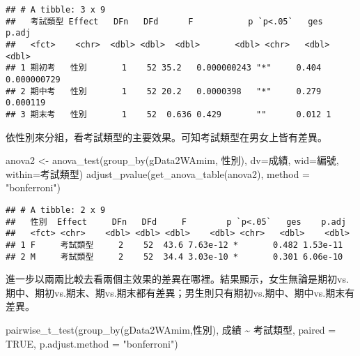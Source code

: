 \documentclass[
]{book}
\newenvironment{Shaded}{\begin{snugshade}}{\end{snugshade}}
\newcommand{\AttributeTok}[1]{\textcolor[rgb]{0.77,0.63,0.00}{#1}}
\newcommand{\ConstantTok}[1]{\textcolor[rgb]{0.00,0.00,0.00}{#1}}
\newcommand{\FunctionTok}[1]{\textcolor[rgb]{0.00,0.00,0.00}{#1}}
\newcommand{\NormalTok}[1]{#1}
\newcommand{\OtherTok}[1]{\textcolor[rgb]{0.56,0.35,0.01}{#1}}
\newcommand{\SpecialCharTok}[1]{\textcolor[rgb]{0.00,0.00,0.00}{#1}}
\newcommand{\StringTok}[1]{\textcolor[rgb]{0.31,0.60,0.02}{#1}}
\begin{document}
\begin{verbatim}
## # A tibble: 3 x 9
##   考試類型 Effect   DFn   DFd      F           p `p<.05`   ges       p.adj
##   <fct>    <chr>  <dbl> <dbl>  <dbl>       <dbl> <chr>   <dbl>       <dbl>
## 1 期初考   性別       1    52 35.2   0.000000243 "*"     0.404 0.000000729
## 2 期中考   性別       1    52 20.2   0.0000398   "*"     0.279 0.000119   
## 3 期末考   性別       1    52  0.636 0.429       ""      0.012 1
\end{verbatim}

依性別來分組，看考試類型的主要效果。可知考試類型在男女上皆有差異。

\begin{Shaded}
\begin{Highlighting}[]
\NormalTok{anova2 }\OtherTok{\textless{}{-}} \FunctionTok{anova\_test}\NormalTok{(}\FunctionTok{group\_by}\NormalTok{(gData2WAmim, 性別), }\AttributeTok{dv=}\NormalTok{成績, }\AttributeTok{wid=}\NormalTok{編號, }\AttributeTok{within=}\NormalTok{考試類型)}
\FunctionTok{adjust\_pvalue}\NormalTok{(}\FunctionTok{get\_anova\_table}\NormalTok{(anova2), }\AttributeTok{method =} \StringTok{"bonferroni"}\NormalTok{)}
\end{Highlighting}
\end{Shaded}

\begin{verbatim}
## # A tibble: 2 x 9
##   性別  Effect     DFn   DFd     F        p `p<.05`   ges    p.adj
##   <fct> <chr>    <dbl> <dbl> <dbl>    <dbl> <chr>   <dbl>    <dbl>
## 1 F     考試類型     2    52  43.6 7.63e-12 *       0.482 1.53e-11
## 2 M     考試類型     2    52  34.4 3.03e-10 *       0.301 6.06e-10
\end{verbatim}

進一步以兩兩比較去看兩個主效果的差異在哪裡。結果顯示，女生無論是期初vs.期中、期初vs.期末、期vs.期末都有差異；男生則只有期初vs.期中、期中vs.期末有差異。

\begin{Shaded}
\begin{Highlighting}[]
\FunctionTok{pairwise\_t\_test}\NormalTok{(}\FunctionTok{group\_by}\NormalTok{(gData2WAmim,性別), 成績 }\SpecialCharTok{\textasciitilde{}}\NormalTok{ 考試類型, }\AttributeTok{paired =} \ConstantTok{TRUE}\NormalTok{, }\AttributeTok{p.adjust.method =} \StringTok{"bonferroni"}\NormalTok{)}
\end{Highlighting}
\end{Shaded}
\end{document}
